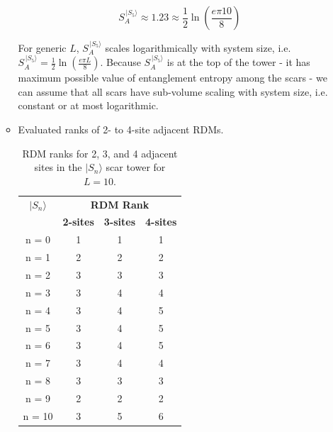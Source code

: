 \documentclass[11pt]{article}
\begin{document}
\begin{itemize}
\begin{itemize}
         \begin{equation}
        S^{\,|S_5\rangle}_A \approx 1.23 \approx \frac{1}{2} \ln \left(\frac{e \pi 10}{8}\right)
        \end{equation}
        
        For generic $L$, $S^{\,|S_5\rangle}_A$ scales logarithmically with system size, i.e. $S^{\,|S_5\rangle}_A = \frac{1}{2} \ln \left(\frac{e \pi L}{8}\right)$. Because $S^{\,|S_5\rangle}_A$ is at the top of the tower - it has maximum possible 						value of entanglement entropy among the scars - we can assume that all scars have sub-volume scaling with system size, i.e. constant or at most logarithmic.
        
        \item Evaluated ranks of 2- to 4-site adjacent RDMs.
         \begin{table}[H]
	\centering
	\begin{tabular}{|c|ccc|}
	\hline
	\textbf{$|S_n\rangle$} & \multicolumn{3}{c|}{\textbf{RDM Rank}} \\
	\cline{2-4}
	& \textbf{2-sites} & \textbf{3-sites} & \textbf{4-sites}\\
	\hline
	 n = 0 & 1 & 1 & 1 \\
	 n = 1 & 2 & 2 & 2 \\
	 n = 2 & 3 & 3 & 3 \\
	 n = 3 & 3 & 4 & 4 \\
	 n = 4 & 3 & 4 & 5 \\  
	 n = 5 & 3 & 4 & 5 \\
	 n = 6 & 3 & 4 & 5 \\
	 n = 7 & 3 & 4 & 4 \\
	 n = 8 & 3 & 3 & 3 \\
	 n = 9 & 2 & 2 & 2 \\
	 n = 10 & 3 & 5 & 6 \\
	\hline
	\end{tabular}
	\caption{RDM ranks for 2, 3, and 4 adjacent sites in the $|S_n\rangle$ scar tower for $L=10$.}
	\label{tab:ranks21}
	\end{table}


\end{itemize}
\end{itemize}
\end{document}
